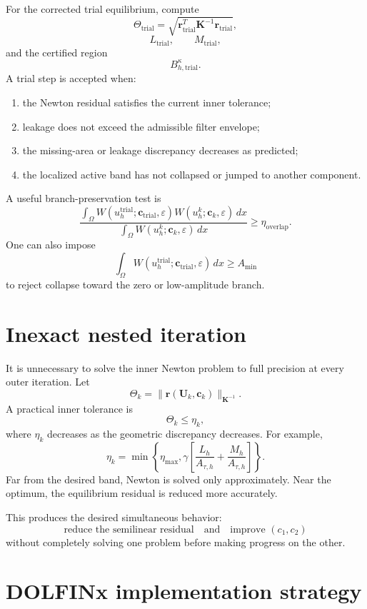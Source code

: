 \documentclass[11pt]{article}
\newcommand{\bU}{\mathbf{U}}
\newcommand{\bc}{\mathbf{c}}
\newcommand{\br}{\mathbf{r}}
\newcommand{\bK}{\mathbf{K}}
\begin{document}
For the corrected trial equilibrium, compute
\[
\Theta_{\mathrm{trial}}
=
\sqrt{
\br_{\mathrm{trial}}^T
\bK^{-1}
\br_{\mathrm{trial}}
},
\]
\[
L_{\mathrm{trial}},
\qquad
M_{\mathrm{trial}},
\]
and the certified region
\[
B_{h,\mathrm{trial}}^\kappa.
\]
A trial step is accepted when:
\begin{enumerate}[leftmargin=2em]
\item the Newton residual satisfies the current inner tolerance;
\item leakage does not exceed the admissible filter envelope;
\item the missing-area or leakage discrepancy decreases as predicted;
\item the localized active band has not collapsed or jumped to another component.
\end{enumerate}
A useful branch-preservation test is
\[
\frac{
\int_\Omega
W(u_h^{\mathrm{trial}};\bc_{\mathrm{trial}},\varepsilon)
W(u_h^k;\bc_k,\varepsilon)\,dx
}{
\int_\Omega
W(u_h^k;\bc_k,\varepsilon)\,dx
}
\geq
\eta_{\mathrm{overlap}}.
\]
One can also impose
\[
\int_\Omega
W(u_h^{\mathrm{trial}};\bc_{\mathrm{trial}},\varepsilon)\,dx
\geq
A_{\min}
\]
to reject collapse toward the zero or low-amplitude branch.

\section{Inexact nested iteration}

It is unnecessary to solve the inner Newton problem to full precision at every outer iteration.
Let
\[
\Theta_k
=
\|\br(\bU_k,\bc_k)\|_{\bK^{-1}}.
\]
A practical inner tolerance is
\[
\Theta_k
\leq
\eta_k,
\]
where $\eta_k$ decreases as the geometric discrepancy decreases. For example,
\[
\eta_k
=
\min
\left\{
\eta_{\max},
\gamma
\left[
\frac{L_h}{A_{\tau,h}}
+
\frac{M_h}{A_{\tau,h}}
\right]
\right\}.
\]
Far from the desired band, Newton is solved only approximately. Near the optimum, the equilibrium residual is reduced more accurately.

This produces the desired simultaneous behavior:
\[
\text{reduce the semilinear residual}
\quad\text{and}\quad
\text{improve }(c_1,c_2)
\]
without completely solving one problem before making progress on the other.

\section{DOLFINx implementation strategy}
\end{document}
